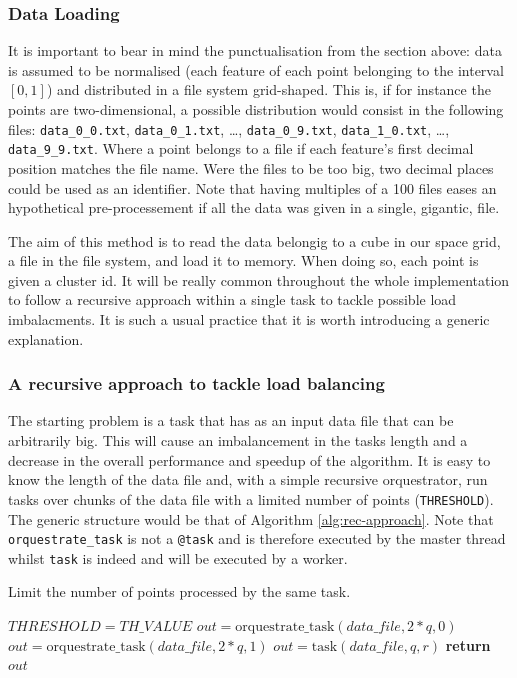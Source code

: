\documentclass[10pt,journal,compsoc]{IEEEtran}
\let\MYoriglatexcaption\caption
\renewcommand{\caption}[2][\relax]{\MYoriglatexcaption[#2]{#2}}
\begin{document}
\subsubsection{Data Loading} \label{data_pre_process}
It is important to bear in mind the punctualisation from the section above: data is assumed to be normalised (each feature of each point belonging to the interval $[0,1]$) and distributed in a file system grid-shaped. This is, if for instance the points are two-dimensional, a possible distribution would consist in the following files: \texttt{data\_0\_0.txt}, \texttt{data\_0\_1.txt}, \dots, \texttt{data\_0\_9.txt}, \texttt{data\_1\_0.txt}, \dots, \texttt{data\_9\_9.txt}. Where a point belongs to a file if each feature's first decimal position matches the file name. Were the files to be too big, two decimal places could be used as an identifier. Note that having multiples of a 100 files eases an hypothetical pre-processement if all the data was given in a single, gigantic, file.

The aim of this method is to read the data belongig to a cube in our space grid, a file in the file system, and load it to memory. When doing so, each point is given a cluster id. It will be really common throughout the whole implementation to follow a recursive approach within a single task to tackle possible load imbalacments. It is such a usual practice that it is worth introducing a generic explanation.

\subsubsection*{A recursive approach to tackle load balancing} \label{recursive_approach}
The starting problem is a task that has as an input data file that can be arbitrarily big. This will cause an imbalancement in the tasks length and a decrease in the overall performance and speedup of the algorithm. It is easy to know the length of the data file and, with a simple recursive orquestrator, run tasks over chunks of the data file with a limited number of points (\texttt{THRESHOLD}). The generic structure would be that of Algorithm \ref{alg:rec-approach}. Note that \texttt{orquestrate\_task} is not a \texttt{@task} and is therefore executed by the master thread whilst \texttt{task} is indeed and will be executed by a worker.

\begin{algorithm}
  \caption{Limit the number of points processed by the same task. \label{alg:rec-approach}}
  \begin{algorithmic}[1]
        \State $THRESHOLD = TH\_VALUE$
        \State $out = \text{orquestrate\_task}(data\_file, 2*q, 0)$
        \State $out = \text{orquestrate\_task}(data\_file, 2*q, 1)$
        \Else
        \State $out = \text{task}(data\_file, q, r)$
        \EndIf
        \State \textbf{return} $out$
    \EndFunction
  \end{algorithmic}
\end{algorithm}
\end{document}
